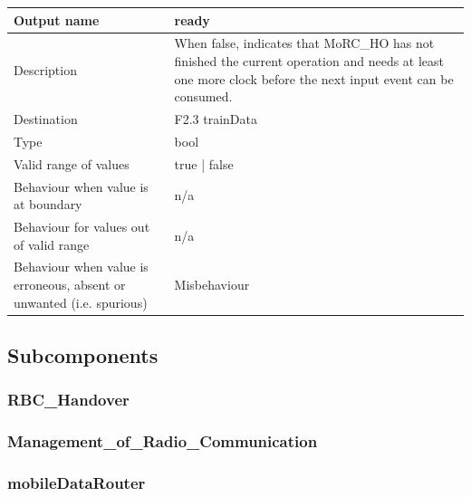 \begin{longtable}{p{}p{}}
	\toprule
	Output name				& ready \\
	\midrule
	Description				& When false, indicates that MoRC\_HO has not finished the current operation and needs at least one more clock before the next input event can be consumed. \\
	\midrule
	Destination				& F2.3 trainData \\ 
	\midrule
	Type					& bool \\
	\midrule
	Valid range of values	& true | false \\
	\midrule
	Behaviour when value is at boundary	& n/a \\
	\midrule
	Behaviour for values out of valid range	& n/a \\
	\midrule
	Behaviour when value is erroneous, absent or unwanted (i.e. spurious) & Misbehaviour \\
	\bottomrule
\end{longtable}



\subsection{Subcomponents}\label{s:manage_radio_communication_subcomponents}

\subsubsection{RBC\_Handover}


\subsubsection{Management\_of\_Radio\_Communication}


\subsubsection{mobileDataRouter}

